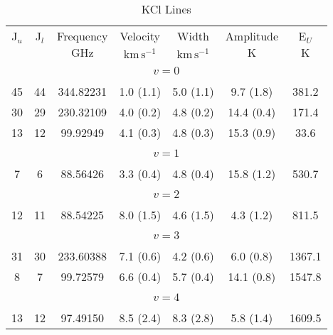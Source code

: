 \begin{table*}[htp]
\centering
\caption{KCl Lines}
\begin{tabular}{ccccccc}
\label{tab:KCl_salt_lines}
 J$_u$ & J$_l$ & Frequency & Velocity & Width & Amplitude & E$_U$ \\
  &  & $\mathrm{GHz}$ & $\mathrm{km\,s^{-1}}$ & $\mathrm{km\,s^{-1}}$ & $\mathrm{K}$ & $\mathrm{K}$ \\
\hline
&\vspace{-0.75em}\\
\multicolumn{7}{c}{$v = 0$} \\
\vspace{-0.75em}\\
 45 & 44 & 344.82231 & 1.0 (1.1) & 5.0 (1.1) & 9.7 (1.8) & 381.2 \\
 30 & 29 & 230.32109 & 4.0 (0.2) & 4.8 (0.2) & 14.4 (0.4) & 171.4 \\
 13 & 12 & 99.92949 & 4.1 (0.3) & 4.8 (0.3) & 15.3 (0.9) & 33.6 \\
&\vspace{-0.75em}\\
\multicolumn{7}{c}{$v = 1$} \\
\vspace{-0.75em}\\
 7 & 6 & 88.56426 & 3.3 (0.4) & 4.8 (0.4) & 15.8 (1.2) & 530.7 \\
&\vspace{-0.75em}\\
\multicolumn{7}{c}{$v = 2$} \\
\vspace{-0.75em}\\
 12 & 11 & 88.54225 & 8.0 (1.5) & 4.6 (1.5) & 4.3 (1.2) & 811.5 \\
&\vspace{-0.75em}\\
\multicolumn{7}{c}{$v = 3$} \\
\vspace{-0.75em}\\
 31 & 30 & 233.60388 & 7.1 (0.6) & 4.2 (0.6) & 6.0 (0.8) & 1367.1 \\
 8 & 7 & 99.72579 & 6.6 (0.4) & 5.7 (0.4) & 14.1 (0.8) & 1547.8 \\
&\vspace{-0.75em}\\
\multicolumn{7}{c}{$v = 4$} \\
\vspace{-0.75em}\\
 13 & 12 & 97.49150 & 8.5 (2.4) & 8.3 (2.8) & 5.8 (1.4) & 1609.5 \\

\end{tabular}
\end{table*}
